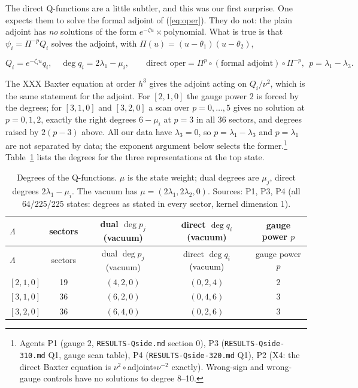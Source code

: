 \documentclass[11pt]{article}
\begin{document}
The direct Q-functions are a little subtler, and this was our first surprise.
One expects them to solve the formal adjoint of (\ref{eq:oper}).
They do not: the plain adjoint has \emph{no} solutions of the form $e^{-\zeta u}\times$polynomial.
What is true is that $\psi_i=\Pi^{-p}Q_i$ solves the adjoint, with $\Pi(u)=(u-\theta_1)(u-\theta_2)$,

\begin{equation}
Q_i=e^{-\zeta_iu}q_i,\quad \deg q_i=2\lambda_1-\mu_i,\qquad \text{direct oper}=\Pi^{p}\circ(\text{formal adjoint})\circ\Pi^{-p},\ \ p=\lambda_1-\lambda_3.\label{eq:direct}
\end{equation}

The XXX Baxter equation at order $h^3$ gives the adjoint acting on $Q_i/\nu^2$, which is the same statement for the adjoint.
For $[2,1,0]$ the gauge power $2$ is forced by the degrees; for $[3,1,0]$ and $[3,2,0]$ a scan over $p=0,\dots,5$ gives no solution at $p=0,1,2$, exactly the right degrees $6-\mu_i$ at $p=3$ in all 36 sectors, and degrees raised by $2(p-3)$ above.
All our data have $\lambda_3=0$, so $p=\lambda_1-\lambda_3$ and $p=\lambda_1$ are not separated by data; the exponent argument below selects the former.\footnote{Agents P1 (gauge $2$, \texttt{RESULTS-\allowbreak{}Qside.\allowbreak{}md} section 0), P3 (\texttt{RESULTS-\allowbreak{}Qside-\allowbreak{}310.\allowbreak{}md} Q1, gauge scan table), P4 (\texttt{RESULTS-\allowbreak{}Qside-\allowbreak{}320.\allowbreak{}md} Q1), P2 (X4: the direct Baxter equation is $\nu^2\circ$adjoint$\circ\nu^{-2}$ exactly).
Wrong-sign and wrong-gauge controls have no solutions to degree 8--10.} Table~\ref{tab:degrees} lists the degrees for the three representations at the top state.

{\small
\begin{longtable}{lcccc}
\caption{Degrees of the Q-functions. $\mu$ is the state weight; dual degrees are $\mu_j$, direct degrees $2\lambda_1-\mu_i$. The vacuum has $\mu=(2\lambda_1,2\lambda_2,0)$. Sources: P1, P3, P4 (all 64/225/225 states: degrees as stated in every sector, kernel dimension 1).}\label{tab:degrees}\\
\toprule
$\Lambda$ & sectors & dual $\deg p_j$ (vacuum) & direct $\deg q_i$ (vacuum) & gauge power $p$ \\
\midrule
\endfirsthead
\toprule
$\Lambda$ & sectors & dual $\deg p_j$ (vacuum) & direct $\deg q_i$ (vacuum) & gauge power $p$ \\
\midrule
\endhead
\bottomrule
\endlastfoot
$[2,1,0]$ & 19 & $(4,2,0)$ & $(0,2,4)$ & 2 \\
$[3,1,0]$ & 36 & $(6,2,0)$ & $(0,4,6)$ & 3 \\
$[3,2,0]$ & 36 & $(6,4,0)$ & $(0,2,6)$ & 3 \\
\end{longtable}}
\end{document}
